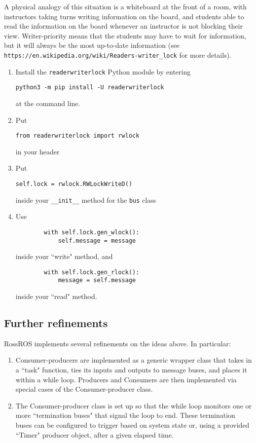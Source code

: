 \documentclass[11pt]{article}
\begin{document}
\begin{enumerate}
\begin{enumerate}
\end{enumerate}
A physical analogy of this situation is a whiteboard at the front of a room, with instructors taking turns writing information on the board, and students able to read the information on the board whenever an instructor is not blocking their view. Writer-priority means that the students may have to wait for information, but it will always be the most up-to-date information (see \verb#https://en.wikipedia.org/wiki/Readers-writer_lock# for more details).
\begin{enumerate}
\item Install the \verb#readerwriterlock# Python module by entering
\begin{lstlisting}
python3 -m pip install -U readerwriterlock
\end{lstlisting}
at the command line.
\item Put
\begin{lstlisting}
from readerwriterlock import rwlock
\end{lstlisting}
in your header
\item Put
\begin{lstlisting}
self.lock = rwlock.RWLockWriteD()
\end{lstlisting}
inside your \verb#__init__# method for the \verb#bus# class
\item Use
\begin{lstlisting}
        with self.lock.gen_wlock():
            self.message = message
\end{lstlisting}
inside your ``write" method, and
\begin{lstlisting}
        with self.lock.gen_rlock():
            message = self.message
\end{lstlisting}
inside your ``read" method.

\end{enumerate}


\end{enumerate}

\subsection{Further refinements}

RossROS implements several refinements on the ideas above. In particular:

\begin{enumerate}
\item Consumer-producers are implemented as a generic wrapper class that takes in a ``task" function, ties its inputs and outputs to message buses, and places it within a while loop. Producers and Consumers are then implemented via special cases of the Consumer-producer class.
\item The Consumer-producer class is set up so that the while loop monitors one or more ``termination buses" that signal the loop to end. These termination buses can be configured to trigger based on system state or, using a provided ``Timer" producer object, after a given elapsed time.
\end{enumerate}
\end{document}

